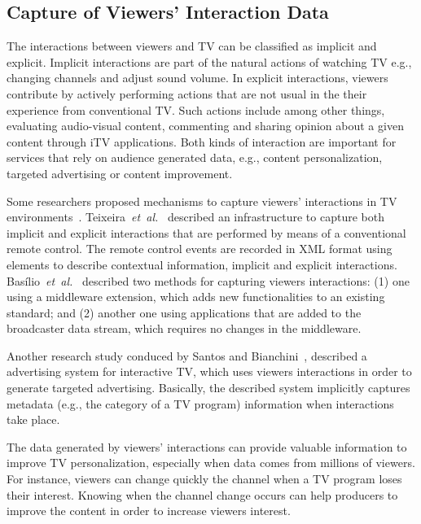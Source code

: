\documentclass[journal]{IEEEtran}
\begin{document}
\subsection{Capture of Viewers' Interaction Data}
\label{ssec_capture_viewers_int_data}

The interactions between viewers and TV can be classified as implicit and explicit. Implicit interactions are part of the natural actions of watching TV e.g., changing channels and adjust sound volume. In explicit interactions, viewers contribute by actively performing actions that are not usual in the their experience from conventional TV. Such actions include among other things, evaluating audio-visual content, commenting and sharing opinion about a given content through iTV applications. Both kinds of interaction are important for services that rely on audience generated data, e.g., content personalization, targeted advertising or content improvement.

Some researchers proposed mechanisms to capture viewers' interactions in TV environments~\cite{Teixeira2010,Basilio2013,DosSantos2013}. Teixeira~\emph{et~al.}~\cite{Teixeira2010} described an infrastructure to capture both implicit and explicit interactions that are performed by means of a conventional remote control. The remote control events are recorded in XML format using elements to describe contextual information, implicit and explicit interactions. Basílio~\emph{et~al.}~\cite{Basilio2013} described two methods for capturing viewers interactions: (1) one using a middleware extension, which adds new functionalities to an existing standard; and (2) another one using applications that are added to the broadcaster data stream, which requires no changes in the middleware.

Another research study conduced by Santos and Bianchini~\cite{DosSantos2013}, described a advertising system for interactive TV, which uses viewers interactions in order to generate targeted advertising. Basically, the described system implicitly captures metadata (e.g., the category of a TV program) information when interactions take place.

The data generated by viewers' interactions can provide valuable information to improve TV personalization, especially when data comes from millions of viewers. For instance, viewers can change quickly the channel when a TV program loses their interest. Knowing when the channel change occurs can help producers to improve the content in order to increase viewers interest.
\end{document}
